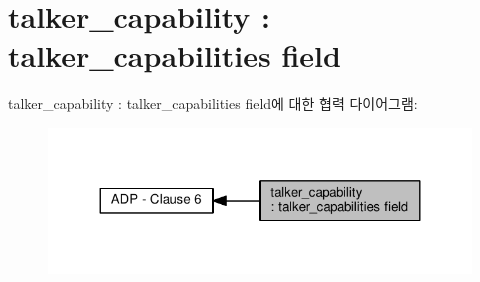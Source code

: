 \hypertarget{group__talker__capability}{}\section{talker\+\_\+capability \+: talker\+\_\+capabilities field}
\label{group__talker__capability}
talker\+\_\+capability \+: talker\+\_\+capabilities field에 대한 협력 다이어그램\+:
\nopagebreak
\begin{figure}[H]
\begin{center}
\leavevmode
\includegraphics[width=324pt]{group__talker__capability}
\end{center}
\end{figure}
